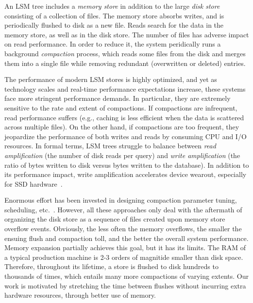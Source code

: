 An LSM tree includes a \emph{memory store} in addition to the large \emph{disk store} consisting of a collection of files. 
The memory store absorbs writes, and is periodically flushed to disk as a new file. Reads search for the data
in the memory store, as well as in the disk store. The number of files has adverse impact on read performance. 
In order to reduce it, the system peridically runs a background \emph{compaction} process, which reads some files from 
the disk and merges them into a single file while removing redundant (overwritten or deleted) entries.%

The performance of modern LSM stores is highly optimized, and yet as technology scales and real-time 
performance expectations increase, these systems face more stringent performance demands. In particular, 
they are extremely sensitive to the rate and extent of compactions. If compactions are infrequent, read performance
suffers (e.g., caching is less efficient when the data is scattered across multiple files). On the other hand, if 
compactions are too frequent, they jeopardize the performance of both writes and reads by consuming CPU 
and I/O resources. In formal terms, LSM trees struggle to balance between {\em read amplification} (the number 
of disk reads per query) and {\em write amplification} (the ratio of bytes written to disk versus bytes written to the 
database). In addition to its performance impact, write amplification accelerates device wearout, especially for SSD 
hardware~\cite{Hu:2009}. 

Enormous effort has been invested in designing compaction parameter tuning, scheduling, etc.~\cite{hbasetuning,
universalcompaction,scylladbcompaction,Sears:2012}. However, all these approaches only deal with the aftermath
of organizing the disk store as a sequence of files created upon memory store overflow events. Obviously, the less 
often the memory overflows, the smaller the ensuing flush and compaction toll, and the better the overall 
system performance. Memory expansion partially achieves this goal, but it has its limits. The RAM of a typical 
production machine is 2-3 orders of magnitide smaller than disk space. Therefore, throughout its lifetime, a store 
is flushed to disk hundreds to thousands of times, which entails many more compactions of varying extents.  
Our work is motivated by stretching the time between flushes without incurring extra hardware resources, 
through better use of memory. 


